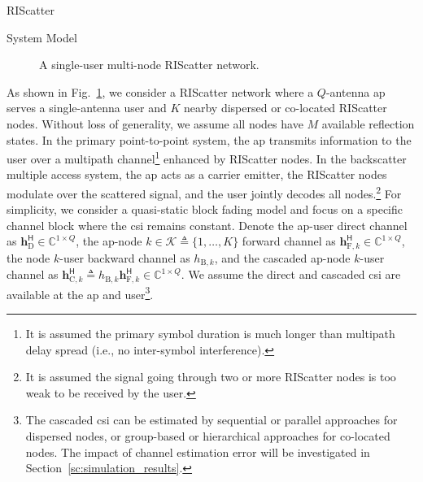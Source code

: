 \begin{section}{RIScatter}
	\begin{subsection}{System Model}
		\label{sc:system_model}
		\begin{figure}[!t]
			\centering
			\def\svgwidth{0.7\columnwidth}
			
			\caption{A single-user multi-node RIScatter network.}
			\label{fg:riscatter_network}
		\end{figure}
		As shown in Fig.~\ref{fg:riscatter_network}, we consider a RIScatter network where a $Q$-antenna \gls{ap} serves a single-antenna user and $K$ nearby dispersed or co-located RIScatter nodes.
		Without loss of generality, we assume all nodes have $M$ available reflection states.
		In the primary point-to-point system, the \gls{ap} transmits information to the user over a multipath channel\footnote{It is assumed the primary symbol duration is much longer than multipath delay spread (i.e., no inter-symbol interference).} enhanced by RIScatter nodes.
		In the backscatter multiple access system, the \gls{ap} acts as a carrier emitter, the RIScatter nodes modulate over the scattered signal, and the user jointly decodes all nodes.\footnote{It is assumed the signal going through two or more RIScatter nodes is too weak to be received by the user.}
		For simplicity, we consider a quasi-static block fading model and focus on a specific channel block where the \gls{csi} remains constant.
		Denote the \gls{ap}-user direct channel as $\boldsymbol{h}_{\text{D}}^\mathsf{H} \in \mathbb{C}^{1 \times Q}$, the \gls{ap}-node $k \in \mathcal{K} \triangleq \{1,\ldots,K\}$ forward channel as $\boldsymbol{h}_{\text{F},k}^\mathsf{H} \in \mathbb{C}^{1 \times Q}$, the node $k$-user backward channel as $h_{\text{B},k}$, and the cascaded \gls{ap}-node $k$-user channel as $\boldsymbol{h}_{\text{C},k}^\mathsf{H} \triangleq h_{\text{B},k} \boldsymbol{h}_{\text{F},k}^\mathsf{H} \in \mathbb{C}^{1 \times Q}$.
		We assume the direct and cascaded \gls{csi} are available at the \gls{ap} and user\footnote{The cascaded \gls{csi} can be estimated by sequential \cite{Bharadia2015,Yang2015b,Guo2019g} or parallel \cite{Jin2021a} approaches for dispersed nodes, or group-based \cite{Zheng2019} or hierarchical \cite{You2019} approaches for co-located nodes. The impact of channel estimation error will be investigated in Section~\ref{sc:simulation_results}.}.


\end{subsection}
\end{section}
